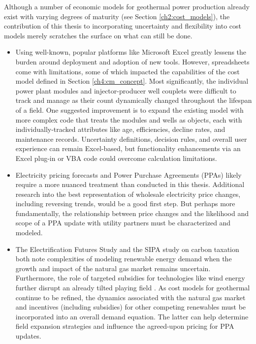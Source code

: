 Although a number of economic models for geothermal power production already exist with varying degrees of maturity (see Section \ref{ch2:cost_models}), the contribution of this thesis to incorporating uncertainty and flexibility into cost models merely scratches the surface on what can still be done.
\begin{itemize}
    \item Using well-known, popular platforms like Microsoft Excel greatly lessens the burden around deployment and adoption of new tools. However, spreadsheets come with limitations, some of which impacted the capabilities of the cost model defined in Section \ref{ch4:cm_concept}. Most significantly, the individual power plant modules and injector-producer well couplets were difficult to track and manage as their count dynamically changed throughout the lifespan of a field. One suggested improvement is to expand the existing model with more complex code that treats the modules and wells as objects, each with individually-tracked attributes like age, efficiencies, decline rates, and maintenance records. Uncertainty definitions, decision rules, and overall user experience can remain Excel-based, but functionality enhancements via an Excel plug-in or VBA code could overcome calculation limitations.
    \item Electricity pricing forecasts and Power Purchase Agreements (PPAs) likely require a more nuanced treatment than conducted in this thesis. Additional research into the best representation of wholesale electricity price changes, including reversing trends, would be a good first step. But perhaps more fundamentally, the relationship between price changes and the likelihood and scope of a PPA update with utility partners must be characterized and modeled.
    \item The Electrification Futures Study \citep{murphy_electrification_2021} and the SIPA study on carbon taxation \citep{larson_energy_2018} both note complexities of modeling renewable energy demand when the growth and impact of the natural gas market remains uncertain. Furthermore, the role of targeted subsidies for technologies like wind energy further disrupt an already tilted playing field \citep[see][]{lazard_lazards_2020}. As cost models for geothermal continue to be refined, the dynamics associated with the natural gas market and incentives (including subsidies) for other competing renewables must be incorporated into an overall demand equation. The latter can help determine field expansion strategies and influence the agreed-upon pricing for PPA updates.

\end{itemize}
